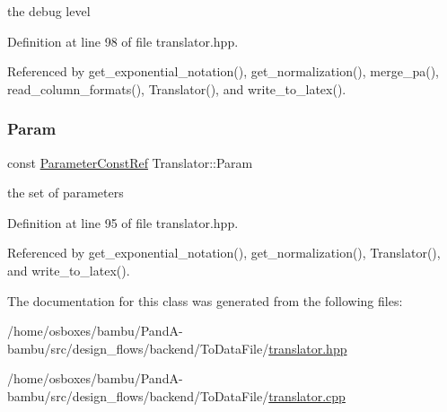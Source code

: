 the debug level 



Definition at line 98 of file translator.\+hpp.



Referenced by get\+\_\+exponential\+\_\+notation(), get\+\_\+normalization(), merge\+\_\+pa(), read\+\_\+column\+\_\+formats(), Translator(), and write\+\_\+to\+\_\+latex().

\mbox{\label{classTranslator_a3488e803db68b5e706c6d6a7bdadb25f}} 
\subsubsection{\texorpdfstring{Param}{Param}}
{\footnotesize\ttfamily const \hyperlink{Parameter_8hpp_a37841774a6fcb479b597fdf8955eb4ea}{Parameter\+Const\+Ref} Translator\+::\+Param\hspace{0.3cm}{\ttfamily [private]}}



the set of parameters 



Definition at line 95 of file translator.\+hpp.



Referenced by get\+\_\+exponential\+\_\+notation(), get\+\_\+normalization(), Translator(), and write\+\_\+to\+\_\+latex().



The documentation for this class was generated from the following files\+:\begin{DoxyCompactItemize}
\item 
/home/osboxes/bambu/\+Pand\+A-\/bambu/src/design\+\_\+flows/backend/\+To\+Data\+File/\hyperlink{translator_8hpp}{translator.\+hpp}\item 
/home/osboxes/bambu/\+Pand\+A-\/bambu/src/design\+\_\+flows/backend/\+To\+Data\+File/\hyperlink{translator_8cpp}{translator.\+cpp}\end{DoxyCompactItemize}
